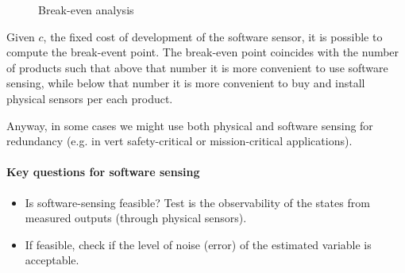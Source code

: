 \begin{figure}[H]
    \centering
    \caption*{Break-even analysis}
\end{figure}

Given $c$, the fixed cost of development of the software sensor, it is possible to compute the break-event point.
The break-even point coincides with the number of products such that above that number it is more convenient to use software sensing, while below that number it is more convenient to buy and install physical sensors per each product.

Anyway, in some cases we might use both physical and software sensing for redundancy (e.g. in vert safety-critical or mission-critical applications).

\paragraph{Key questions for software sensing}

\begin{itemize}
    \item Is software-sensing feasible? Test is the observability of the states from measured outputs (through physical sensors).
    \item If feasible, check if the level of noise (error) of the estimated variable is acceptable.
\end{itemize}


